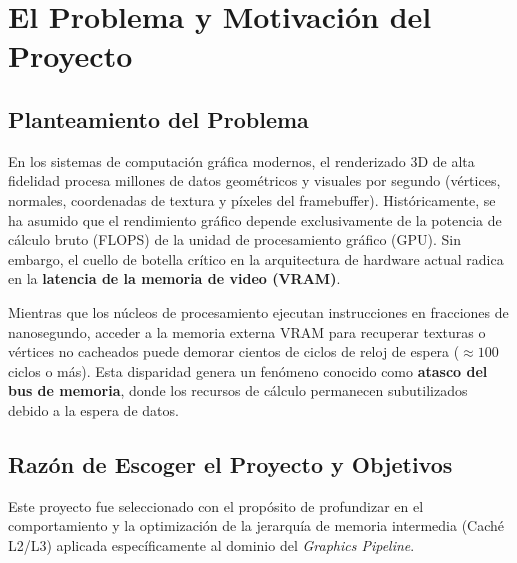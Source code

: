 \documentclass[12pt,letterpaper]{article}
\begin{document}
\vspace{0.8cm}
\begin{center}
    \textbf{\color{UCBlue}{Valencia, Octubre de 2026}}
\end{center}

\newpage 
{} %
\tableofcontents
\newpage

\section{\color{UCBlue}El Problema y Motivación del Proyecto}

\subsection{\color{UCSky}Planteamiento del Problema}
En los sistemas de computación gráfica modernos, el renderizado 3D de alta fidelidad procesa millones de datos geométricos y visuales por segundo (vértices, normales, coordenadas de textura y píxeles del framebuffer). Históricamente, se ha asumido que el rendimiento gráfico depende exclusivamente de la potencia de cálculo bruto (FLOPS) de la unidad de procesamiento gráfico (GPU). Sin embargo, el cuello de botella crítico en la arquitectura de hardware actual radica en la \textbf{latencia de la memoria de video (VRAM)}. 

Mientras que los núcleos de procesamiento ejecutan instrucciones en fracciones de nanosegundo, acceder a la memoria externa VRAM para recuperar texturas o vértices no cacheados puede demorar cientos de ciclos de reloj de espera ($\approx 100$ ciclos o más). Esta disparidad genera un fenómeno conocido como \textbf{atasco del bus de memoria}, donde los recursos de cálculo permanecen subutilizados debido a la espera de datos.

\subsection{\color{UCSky}Razón de Escoger el Proyecto y Objetivos}
Este proyecto fue seleccionado con el propósito de profundizar en el comportamiento y la optimización de la jerarquía de memoria intermedia (Caché L2/L3) aplicada específicamente al dominio del \textit{Graphics Pipeline}. 
\end{document}

